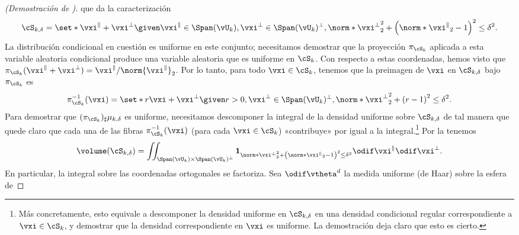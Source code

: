 \documentclass[../../book-main_es.tex]{subfiles}
\begin{document}
\begin{proof}[(Demostración de )]
    que da la caracterización
    \begin{equation}
        \cS_{k, \delta} = \set*{
            \vxi^{\|} + \vxi^{\perp}
            \given
            \vxi^{\|} \in \Span(\vU_k),
            \vxi^{\perp} \in \Span(\vU_k)^\perp,
            \norm*{\vxi^{\perp}}_2^2
            + \left( \norm*{\vxi^{\|}}_2 - 1 \right)^2
            \leq
            \delta^{2}
        }.
    \end{equation}
    La distribución condicional en cuestión es uniforme en este conjunto; necesitamos
    demostrar que la proyección $\pi_{\cS_k}$ aplicada a esta variable aleatoria condicional
    produce una variable aleatoria que es uniforme en $\cS_k$.
    Con respecto a estas coordenadas, hemos visto que $\pi_{\cS_k}(\vxi^\|
    + \vxi^\perp) = \vxi^\| / \norm{\vxi^{\|}}_2$.
    Por lo tanto, para todo $\vxi \in \cS_{k}$, tenemos que la preimagen de $\vxi$ en
    $\cS_{k, \delta}$ bajo $\pi_{\cS_k}$ es
    \begin{equation}
        \pi_{\cS_k}^{-1}(\vxi) = \set*{
            r\vxi + \vxi^\perp
            \given
            r > 0,
            \vxi^{\perp} \in \Span(\vU_k)^\perp,
            \norm*{\vxi^{\perp}}_2^2
            + \left( r - 1 \right)^2
            \leq
            \delta^{2}
        }.
        \label{eq:fiber-of-uos}
    \end{equation}
    Para demostrar que $(\pi_{\cS_k})_{\sharp} \mu_{k, \delta}$ es uniforme, necesitamos
    descomponer la integral de la densidad uniforme sobre $\cS_{k, \delta}$ de tal manera
    que quede claro que cada una de las fibras
    $\pi_{\cS_k}^{-1}(\vxi)$ (para cada $\vxi \in \cS_k$) «contribuye» por igual
    a la integral.\footnote{Más concretamente, esto equivale a descomponer
        la densidad uniforme en $\cS_{k, \delta}$ en una densidad condicional
        regular
        correspondiente a $\vxi \in \cS_{k}$, y demostrar que la densidad correspondiente
    en $\vxi$ es uniforme. La demostración deja claro que esto es cierto.}
    Por la  tenemos
    \begin{equation}
        \volume(\cS_{k, \delta})
        = \iint_{\Span(\vU_k) \times \Span(\vU_k)^\perp} \mathbf{1}_{
            \norm*{\vxi^{\perp}}_2^2
            + \left( \norm*{\vxi^{\|}}_2 - 1 \right)^2
            \leq
            \delta^{2}
        }
        \odif \vxi^{\|} \odif \vxi^{\perp}.
    \end{equation}
    En particular, la integral sobre las coordenadas ortogonales se factoriza.
    Sea $\odif \vtheta^{d}$ la medida uniforme (de Haar) sobre la esfera de

\end{proof}
\end{document}
